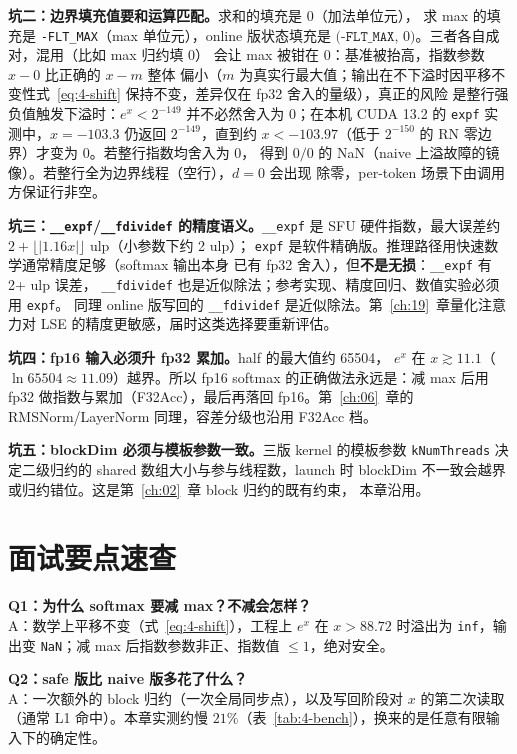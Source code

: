 \textbf{坑二：边界填充值要和运算匹配。}求和的填充是 $0$（加法单位元），
求 max 的填充是 \texttt{-FLT\_MAX}（max 单位元），online 版状态填充是
$\bigl(\texttt{-FLT\_MAX},\, 0\bigr)$。三者各自成对，混用（比如 max 归约填 0）
会让 max 被钳在 0：基准被抬高，指数参数 $x - 0$ 比正确的 $x - m$ 整体
偏小（$m$ 为真实行最大值；输出在不下溢时因平移不变性式~\ref{eq:4-shift}
保持不变，差异仅在 fp32 舍入的量级），真正的风险
是整行强负值触发下溢时：$e^x<2^{-149}$ 并不必然舍入为 0；在本机 CUDA 13.2 的 \texttt{expf} 实测中，$x=-103.3$ 仍返回 $2^{-149}$，直到约 $x<-103.97$（低于 $2^{-150}$ 的 RN 零边界）才变为 0。若整行指数均舍入为 0，
得到 $0/0$ 的
NaN（naive 上溢故障的镜像）。若整行全为边界线程（空行），$d = 0$ 会出现
除零，per-token 场景下由调用方保证行非空。

\textbf{坑三：\texttt{\_\_expf}/\texttt{\_\_fdividef} 的精度语义。}\texttt{\_\_expf}
是 SFU 硬件指数，最大误差约 $2+\lfloor|1.16x|\rfloor$ ulp（小参数下约 2 ulp）；
\texttt{expf} 是软件精确版。推理路径用快速数学通常精度足够（softmax 输出本身
已有 fp32 舍入），但\textbf{不是无损}：\texttt{\_\_expf} 有 2+ ulp 误差，
\texttt{\_\_fdividef} 也是近似除法；参考实现、精度回归、数值实验必须用
\texttt{expf}。
同理 online 版写回的 \texttt{\_\_fdividef} 是近似除法。第~\ref{ch:19}~章量化注意力对
LSE 的精度更敏感，届时这类选择要重新评估。

\textbf{坑四：fp16 输入必须升 fp32 累加。}\allowbreak{}half 的最大值约 65504，
$e^{x}$ 在 $x \gtrsim 11.1$（$\ln 65504 \approx 11.09$）越界。所以 fp16 softmax 的正确做法永远是：减 max 后用 fp32
做指数与累加（F32Acc），最后再落回 fp16。第~\ref{ch:06}~章的 RMSNorm/LayerNorm
同理，容差分级也沿用 F32Acc 档。

\textbf{坑五：blockDim 必须与模板参数一致。}三版 kernel 的模板参数
\texttt{kNumThreads} 决定二级归约的 shared 数组大小与参与线程数，launch 时
blockDim 不一致会越界或归约错位。这是第~\ref{ch:02}~章 block 归约的既有约束，
本章沿用。

\section{面试要点速查}

\textbf{Q1：为什么 softmax 要减 max？不减会怎样？}\\
A：数学上平移不变（式~\ref{eq:4-shift}），工程上 $e^{x}$ 在 $x > 88.72$ 时溢出为
\texttt{inf}，输出变 \texttt{NaN}；减 max 后指数参数非正、指数值 $\le 1$，绝对安全。

\textbf{Q2：safe 版比 naive 版多花了什么？}\\
A：一次额外的 block 归约（一次全局同步点），以及写回阶段对 $x$ 的第二次读取
（通常 L1 命中）。本章实测约慢 $21\%$（表~\ref{tab:4-bench}），换来的是任意有限输入下的确定性。

